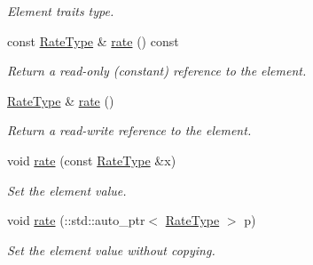 \begin{DoxyCompactItemize}
\begin{DoxyCompactList}\small\item\em Element traits type. \item\end{DoxyCompactList}\item 
const \hyperlink{classopenstack_1_1xml_1_1RateLimits}{RateType} \& \hyperlink{classopenstack_1_1xml_1_1Limits_a2239553def3fe65f1833be1a1c7027b7}{rate} () const 
\begin{DoxyCompactList}\small\item\em Return a read-\/only (constant) reference to the element. \item\end{DoxyCompactList}\item 
\hyperlink{classopenstack_1_1xml_1_1RateLimits}{RateType} \& \hyperlink{classopenstack_1_1xml_1_1Limits_a10a6c48d219401c0848acea2c6c2c687}{rate} ()
\begin{DoxyCompactList}\small\item\em Return a read-\/write reference to the element. \item\end{DoxyCompactList}\item 
void \hyperlink{classopenstack_1_1xml_1_1Limits_add17848f727bdca7c3bb5729d32c4416}{rate} (const \hyperlink{classopenstack_1_1xml_1_1RateLimits}{RateType} \&x)
\begin{DoxyCompactList}\small\item\em Set the element value. \item\end{DoxyCompactList}\item 
void \hyperlink{classopenstack_1_1xml_1_1Limits_a29007e8be6fe4551896e3268d6d49812}{rate} (::std::auto\_\-ptr$<$ \hyperlink{classopenstack_1_1xml_1_1RateLimits}{RateType} $>$ p)
\begin{DoxyCompactList}\small\item\em Set the element value without copying. \item\end{DoxyCompactList}\end{DoxyCompactItemize}
